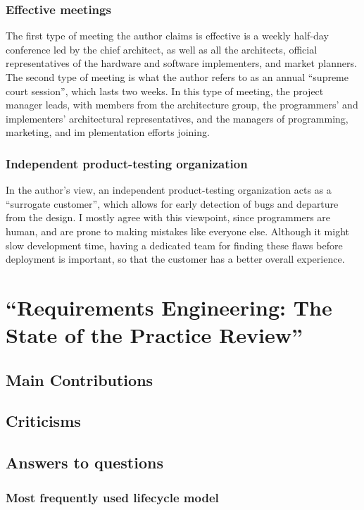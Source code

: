 \documentclass[letterpaper,12pt]{article}
\begin{document}
\subsubsection{Effective meetings}

The first type of meeting the author claims is effective is a weekly half-day
conference led by the chief architect, as well as all the architects, official
representatives of the hardware and software implementers, and market planners.
The second type of meeting is what the author refers to as an annual ``supreme
court session'', which lasts two weeks. In this type of meeting, the project
manager leads, with members from the architecture group,  the programmers' and
implementers' architectural representatives, and the managers of programming,
marketing, and im plementation efforts joining.

\subsubsection{Independent product-testing organization}

In the author's view, an independent product-testing organization acts  as a
``surrogate customer'', which allows for early detection of bugs and departure
from the design. I mostly agree with this viewpoint, since programmers are
human, and are prone to making mistakes like everyone else. Although it might
slow development time, having a dedicated team for finding these flaws before
deployment is important, so that the customer has a better overall experience.

\section{``Requirements Engineering: The State of the Practice Review''}

\subsection{Main Contributions}
\lipsum[3]

\subsection{Criticisms}
\lipsum[4]

\subsection{Answers to questions}
\subsubsection{Most frequently used lifecycle model}
\lipsum[66]
\end{document}
